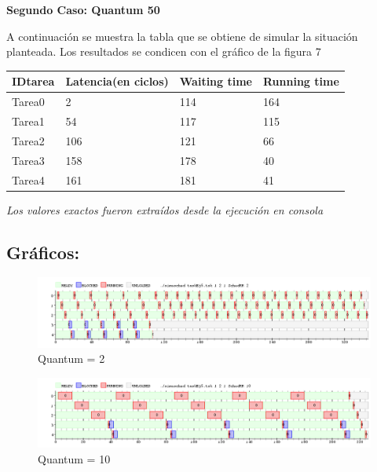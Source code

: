 \documentclass[10pt, a4paper]{article}
\begin{document}
\begin{flushleft}
\textbf{Segundo Caso: Quantum 50}\\
\end{flushleft}

A continuación se muestra la tabla que se obtiene de simular la situación planteada. Los resultados se condicen con el gráfico de la figura 7
\begin{center}
\begin{tabular}{| l | l | l | l |}
    \hline
    IDtarea & Latencia(en ciclos)& Waiting time & Running time\\ \hline
    Tarea0 & 	2 	&	114	&  	164 \\ \hline
    Tarea1 &	54	&	117	& 	115 \\ \hline
    Tarea2 &	106	&	121	&	66 \\ \hline
    Tarea3 &	158	&	178	& 	40 \\ \hline
    Tarea4 &	161	&	181	&	41 \\ \hline

\end{tabular}
\end{center}
\begin{center}
  \textit{Los valores exactos fueron extraídos desde la ejecución en consola}
\end{center}

\subsection{Gráficos:}
\begin{figure}[H]
  	\centering
   	\includegraphics[width=1\textwidth]
   	 {imgs/quantum2.png}
	\caption{Quantum = 2}
\end{figure}


\begin{figure}[H]
  	\centering
   	\includegraphics[width=1\textwidth]
   	 {imgs/quantum10.png}
	\caption{Quantum = 10}
\end{figure}
\end{document}
